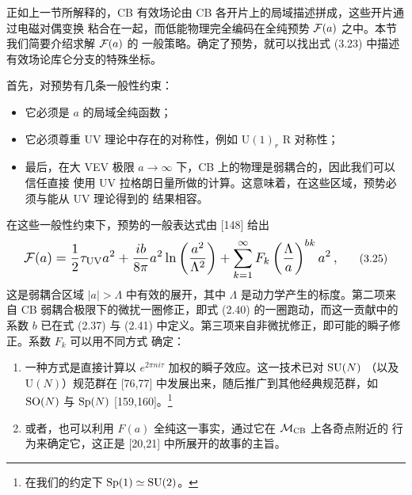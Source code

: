 
正如上一节所解释的，CB 有效场论由 CB 各开片上的局域描述拼成，这些开片通过电磁对偶变换
粘合在一起，而低能物理完全编码在全纯预势 $\mathcal{F}(a)$ 之中。本节我们简要介绍求解 $\mathcal{F}(a)$ 的
一般策略。确定了预势，就可以找出式 (3.23) 中描述有效场论库仑分支的特殊坐标。

首先，对预势有几条一般性约束：
\begin{itemize}
  \item 它必须是 $a$ 的局域全纯函数；
  \item 它必须尊重 UV 理论中存在的对称性，例如 $\mathrm{U}(1)_r$ R 对称性；
  \item 最后，在大 VEV 极限 $a\to\infty$ 下，CB 上的物理是弱耦合的，因此我们可以信任直接
        使用 UV 拉格朗日量所做的计算。这意味着，在这些区域，预势必须与能从 UV 理论得到的
        结果相容。
\end{itemize}

在这些一般性约束下，预势的一般表达式由 [148] 给出
\begin{equation}
  \resizebox{0.82\textwidth}{!}{$\displaystyle
  \cF(a) = \frac{1}{2}\tau_{\mathrm{UV}}a^2
  + \frac{ib}{8\pi}a^2\ln\left(\frac{a^2}{\Lambda^2}\right)
  + \sum_{k=1}^{\infty}F_k\left(\frac{\Lambda}{a}\right)^{bk}a^2\,,$}
  \tag{3.25}
\end{equation}
这是弱耦合区域 $|a|>\Lambda$ 中有效的展开，其中 $\Lambda$ 是动力学产生的标度。第二项来自
CB 弱耦合极限下的微扰一圈修正，即式 (2.40) 的一圈跑动，而这一贡献中的系数 $b$ 已在式
(2.37) 与 (2.41) 中定义。第三项来自非微扰修正，即可能的瞬子修正。系数 $F_k$ 可以用不同方式
确定：

\begin{enumerate}
  \item 一种方式是直接计算以 $e^{2\pi n i\tau}$ 加权的瞬子效应。这一技术已对 $\mathrm{SU}(N)$
        （以及 $\mathrm{U}(N)$）规范群在 [76,77] 中发展出来，随后推广到其他经典规范群，如
        $\mathrm{SO}(N)$ 与 $\mathrm{Sp}(N)$ [159,160]。\footnote{在我们的约定下 $\mathrm{Sp}(1)\simeq\mathrm{SU}(2)$。}
  \item 或者，也可以利用 $F(a)$ 全纯这一事实，通过它在 $\mathcal{M}_{\mathrm{CB}}$ 上各奇点附近的
        行为来确定它，这正是 [20,21] 中所展开的故事的主旨。
\end{enumerate}


